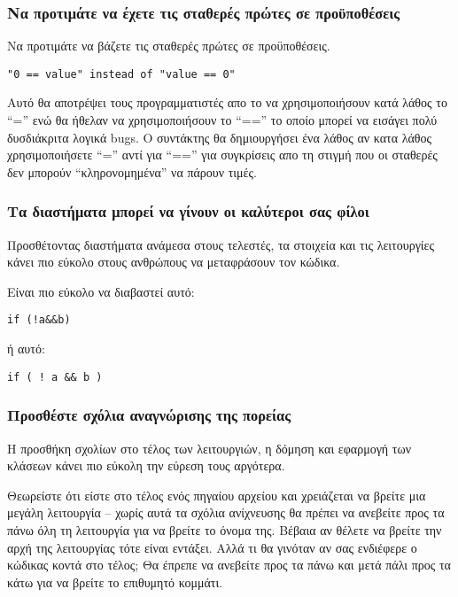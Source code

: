 \hypertarget{toc24}{}
\subsubsection{Να προτιμάτε να έχετε τις σταθερές πρώτες σε προϋποθέσεις}
Να προτιμάτε να βάζετε τις σταθερές πρώτες σε προϋποθέσεις. 

\begin{verbatim}
"0 == value" instead of "value == 0"
\end{verbatim}

Αυτό θα αποτρέψει τους προγραμματιστές απο το να χρησιμοποιήσουν κατά λάθος το “=” ενώ θα ήθελαν να χρησιμοποιήσουν το “==” το οποίο μπορεί να εισάγει πολύ δυσδιάκριτα λογικά bugs. Ο συντάκτης θα δημιουργήσει ένα λάθος αν κατα λάθος χρησιμοποιήσετε “=” αντί για “==” για συγκρίσεις απο τη στιγμή που οι σταθερές δεν μπορούν “κληρονομημένα” να πάρουν τιμές.

\hypertarget{toc25}{}
\subsubsection{Τα διαστήματα μπορεί να γίνουν οι καλύτεροι σας φίλοι}
Προσθέτοντας διαστήματα ανάμεσα στους τελεστές, τα στοιχεία και τις λειτουργίες κάνει πιο εύκολο στους ανθρώπους να μεταφράσουν τον κώδικα.

Είναι πιο εύκολο να διαβαστεί αυτό:

\begin{verbatim}
if (!a&&b)
\end{verbatim}

ή αυτό:

\begin{verbatim}
if ( ! a && b )
\end{verbatim}

\hypertarget{toc26}{}
\subsubsection{Προσθέστε σχόλια αναγνώρισης της πορείας}
Η προσθήκη σχολίων στο τέλος των λειτουργιών, η δόμηση και εφαρμογή των κλάσεων κάνει πιο εύκολη την εύρεση τους αργότερα.

Θεωρείστε ότι είστε στο τέλος ενός πηγαίου αρχείου και χρειάζεται να βρείτε μια μεγάλη λειτουργία – χωρίς αυτά τα σχόλια ανίχνευσης θα πρέπει να ανεβείτε προς τα πάνω όλη τη λειτουργία για να βρείτε το όνομα της. Βέβαια αν θέλετε να βρείτε την αρχή της λειτουργίας τότε είναι εντάξει. Αλλά τι θα γινόταν αν σας ενδιέφερε ο κώδικας κοντά στο τέλος; Θα έπρεπε να ανεβείτε προς τα πάνω και μετά πάλι προς τα κάτω για να βρείτε το επιθυμητό κομμάτι.

